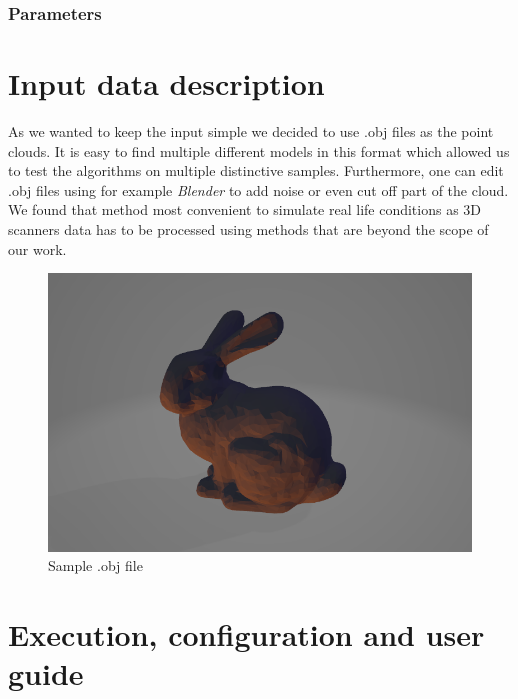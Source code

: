 \documentclass[titlepage]{article}
\begin{document}
\subsubsection{Parameters}

\section{Input data description}

As we wanted to keep the input simple we decided to use .obj files as the point clouds. It is easy to find multiple different models in this format which allowed us to test the algorithms on multiple distinctive samples. Furthermore, one can edit .obj files using for example \textit{Blender} to add noise or even cut off part of the cloud. We found that method most convenient to simulate real life conditions as 3D scanners data has to be processed using methods that are beyond the scope of our work.

\begin{figure}[H]
\includegraphics[width=\textwidth]{ms-bunny.png}
\caption{Sample .obj file}
\end{figure}

\section{Execution, configuration and user guide}
\end{document}
